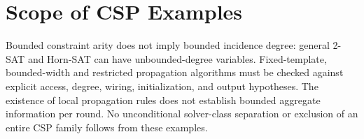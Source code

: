 \appendix
\section{Scope of CSP Examples}
Bounded constraint arity does not imply bounded incidence degree:
general 2-SAT and Horn-SAT can have unbounded-degree variables.
Fixed-template, bounded-width and restricted propagation algorithms
must be checked against explicit access, degree, wiring, initialization,
and output hypotheses. The existence of local propagation rules does
not establish bounded aggregate information per round.
No unconditional solver-class separation or exclusion of an entire
CSP family follows from these examples.
